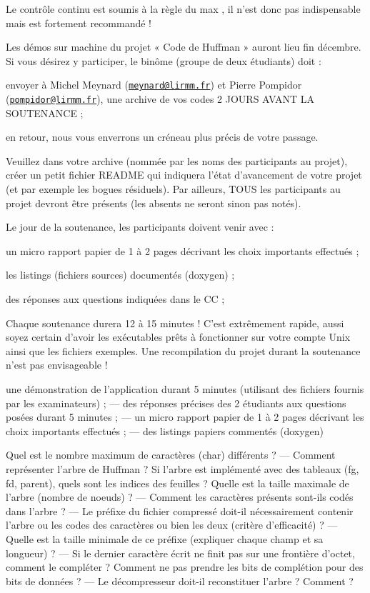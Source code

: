 Le contrôle continu est soumis à la règle du max , il n’est donc pas indispensable mais est fortement recommandé !

Les démos sur machine du projet « Code de Huffman » auront lieu fin décembre. Si vous désirez y participer, le binôme (groupe de deux étudiants) doit \+:
\begin{DoxyItemize}
\item envoyer à Michel Meynard (\href{mailto:meynard@lirmm.fr}{\tt meynard@lirmm.\+fr}) et Pierre Pompidor (\href{mailto:pompidor@lirmm.fr}{\tt pompidor@lirmm.\+fr}), une archive de vos codes 2 J\+O\+U\+RS A\+V\+A\+NT LA S\+O\+U\+T\+E\+N\+A\+N\+CE ;
\item en retour, nous vous enverrons un créneau plus précis de votre passage.
\end{DoxyItemize}

Veuillez dans votre archive (nommée par les noms des participants au projet), créer un petit fichier R\+E\+A\+D\+ME qui indiquera l’état d’avancement de votre projet (et par exemple les bogues résiduels). Par ailleurs, T\+O\+US les participants au projet devront être présents (les absents ne seront sinon pas notés).

Le jour de la soutenance, les participants doivent venir avec \+:
\begin{DoxyItemize}
\item un micro rapport papier de 1 à 2 pages décrivant les choix importants effectués ;
\item les listings (fichiers sources) documentés (doxygen) ;
\item des réponses aux questions indiquées dans le CC ;
\end{DoxyItemize}

Chaque soutenance durera 12 à 15 minutes ! C’est extrêmement rapide, aussi soyez certain d’avoir les exécutables prêts à fonctionner sur votre compte Unix ainsi que les fichiers exemples. Une recompilation du projet durant la soutenance n’est pas envisageable !

une démonstration de l’application durant 5 minutes (utilisant des fichiers fournis par les examinateurs) ; — des réponses précises des 2 étudiants aux questions posées durant 5 minutes ; — un micro rapport papier de 1 à 2 pages décrivant les choix importants effectués ; — des listings papiers commentés (doxygen)

Quel est le nombre maximum de caractères (char) différents ? — Comment représenter l’arbre de Huffman ? Si l’arbre est implémenté avec des tableaux (fg, fd, parent), quels sont les indices des feuilles ? Quelle est la taille maximale de l’arbre (nombre de noeuds) ? — Comment les caractères présents sont-\/ils codés dans l’arbre ? — Le préfixe du fichier compressé doit-\/il nécessairement contenir l’arbre ou les codes des caractères ou bien les deux (critère d’efficacité) ? — Quelle est la taille minimale de ce préfixe (expliquer chaque champ et sa longueur) ? — Si le dernier caractère écrit ne finit pas sur une frontière d’octet, comment le compléter ? Comment ne pas prendre les bits de complétion pour des bits de données ? — Le décompresseur doit-\/il reconstituer l’arbre ? Comment ?

